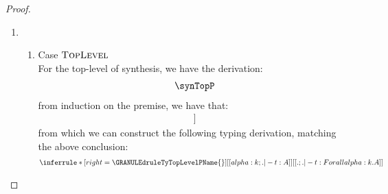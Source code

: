\begin{proof}
\begin{enumerate}
\begin{enumerate}
\end{enumerate}
\item 
  \begin{enumerate}
  \item Case $\textsc{TopLevel}$ \\
        For the top-level of synthesis, we have the derivation:
        \begin{align*}
          \synTopP
        \end{align*}
        from induction on the premise, we have that:
        \begin{align*}
          [[ alpha : k ; .  |- t : A  ]] \tag{ih}
        \end{align*}
        from which we can construct the following typing derivation, matching the above conclusion:
        \begin{align*}
          \inferrule*[right=\GRANULEdruleTyTopLevelPName{}]
            {[[  alpha : k ; . |- t : A ]]}
            {[[ . ; . |- t : Forall alpha : k . A ]]}
        \end{align*}
      \end{enumerate}
    \end{enumerate}


\end{proof}


